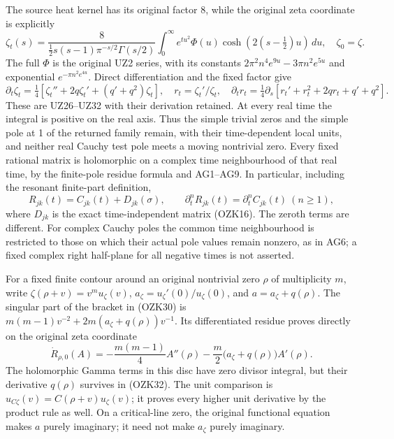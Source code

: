 \documentclass[
  10pt,
  a4paper,
]{article}
\begin{document}
The source heat kernel has its original factor \(8\), while the original
zeta coordinate is explicitly \[
\zeta_t(s)=\frac{8}{\tfrac12s(s-1)\pi^{-s/2}\Gamma(s/2)}
\int_0^\infty e^{tu^2}\Phi(u)\cosh(2(s-\tfrac12)u)\,du,
\quad \zeta_0=\zeta.
\tag{OZK29}
\] The full \(\Phi\) is the original UZ2 series, with its constants
\(2\pi^2n^4e^{9u}-3\pi n^2e^{5u}\) and exponential
\(e^{-\pi n^2e^{4u}}\). Direct differentiation and the fixed factor give
\[
\partial_t\zeta_t=\tfrac14[\zeta_t''+2q\zeta_t'+(q'+q^2)\zeta_t],
\quad r_t=\zeta_t'/\zeta_t,\quad
\partial_t r_t=\tfrac14\partial_s[r_t'+r_t^2+2qr_t+q'+q^2].
\tag{OZK30}
\] These are UZ26--UZ32 with their derivation retained. At every real
time the integral is positive on the real axis. Thus the simple trivial
zeros and the simple pole at 1 of the returned family remain, with their
time-dependent local units, and neither real Cauchy test pole meets a
moving nontrivial zero. Every fixed rational matrix is holomorphic on a
complex time neighbourhood of that real time, by the finite-pole residue
formula and AG1--AG9. In particular, including the resonant finite-part
definition, \[
R_{jk}(t)=C_{jk}(t)+D_{jk}(\sigma),\qquad
\partial_t^nR_{jk}(t)=\partial_t^nC_{jk}(t)\ (n\ge1),
\tag{OZK31}
\] where \(D_{jk}\) is the exact time-independent matrix (OZK16). The
zeroth terms are different. For complex Cauchy poles the common time
neighbourhood is restricted to those on which their actual pole values
remain nonzero, as in AG6; a fixed complex right half-plane for all
negative times is not asserted.

For a fixed finite contour around an original nontrivial zero \(\rho\)
of multiplicity \(m\), write \(\zeta(\rho+v)=v^m u_\zeta(v)\),
\(a_\zeta=u_\zeta'(0)/u_\zeta(0)\), and \(a=a_\zeta+q(\rho)\). The
singular part of the bracket in (OZK30) is
\(m(m-1)v^{-2}+2m(a_\zeta+q(\rho))v^{-1}\). Its differentiated residue
proves directly on the original zeta coordinate \[
\dot R_{\rho,0}(A)
=-\frac{m(m-1)}4A''(\rho)
-\frac m2\bigl(a_\zeta+q(\rho)\bigr)A'(\rho).
\tag{OZK32}
\] The holomorphic Gamma terms in this disc have zero divisor integral,
but their derivative \(q(\rho)\) survives in (OZK32). The unit
comparison is \(u_{C\zeta}(v)=C(\rho+v)u_\zeta(v)\); it proves every
higher unit derivative by the product rule as well. On a critical-line
zero, the original functional equation makes \(a\) purely imaginary; it
need not make \(a_\zeta\) purely imaginary.
\end{document}
